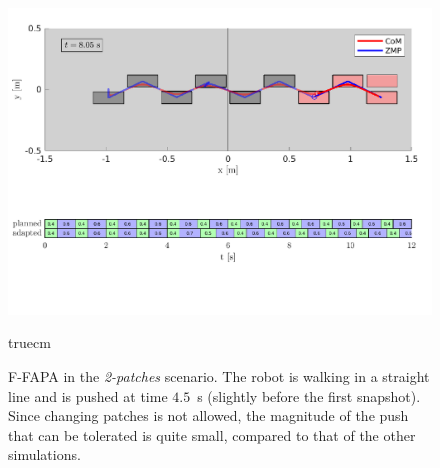 \begin{figure}
    \includegraphics[trim={0 2.2cm 0 8.6cm},clip,width=\textwidth]{figures/two-patches-fixed-completing-task.pdf}
    \caption{F-FAPA in the {\em 2-patches} scenario. The robot is walking in a straight line and is pushed at time $4.5$~s (slightly before the first snapshot). Since changing patches is not allowed, the magnitude of the push that can be tolerated is quite small, compared to that of the other simulations.}
    \label{fig:FAPA:matlab_2pacf}
     truecm
\end{figure}


